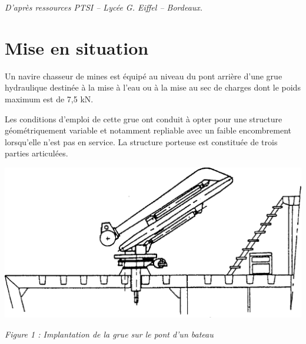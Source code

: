 \documentclass[10pt]{article}
\newif\ifxp
\begin{document}
\ifxp

\else

\fi


\begin{flushright}
\textit{D'après ressources PTSI -- Lycée G. Eiffel -- Bordeaux.}
\end{flushright}
\setlength{\parskip}{0ex plus 0.2ex minus 0ex}
 \renewcommand{\contentsname}{}
 \renewcommand{\baselinestretch}{1}




\section{Mise en situation}

\begin{minipage}[c]{.49\linewidth}
Un navire chasseur de mines est équipé au niveau du pont arrière d'une grue hydraulique destinée à la mise à l'eau ou à la mise au sec de charges dont le poids maximum est de 7,5 kN.

Les conditions d'emploi de cette grue ont conduit à opter pour une structure géométriquement variable et notamment repliable avec un faible encombrement lorsqu'elle n'est pas en service. La structure porteuse est constituée de trois parties articulées. 
\end{minipage} \hfill
\begin{minipage}[c]{.49\linewidth}
\begin{center}
\includegraphics[width=.95\textwidth]{images/Grue}

\textit{Figure 1 : Implantation de la grue sur le pont d'un bateau}
\end{center}
\end{minipage} 

\vspace{.25cm}
\end{document}
